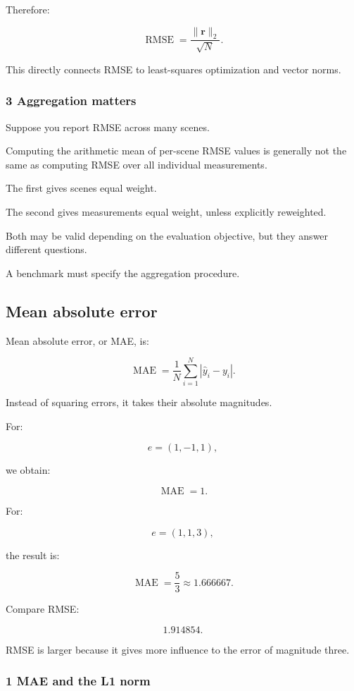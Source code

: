 Therefore:

\[
 \boxed{ \operatorname{RMSE} = \frac{\|\mathbf r\|_2}{\sqrt N} }.
\]

This directly connects RMSE to least-squares optimization and vector norms.

\subsubsection{3 Aggregation matters}\label{02-foundations-ii-ch030-aggregation-matters}

Suppose you report RMSE across many scenes.

Computing the arithmetic mean of per-scene RMSE values is generally not the same as computing RMSE over all individual measurements.

The first gives scenes equal weight.

The second gives measurements equal weight, unless explicitly reweighted.

Both may be valid depending on the evaluation objective, but they answer different questions.

A benchmark must specify the aggregation procedure.

\subsection{Mean absolute error}\label{02-foundations-ii-ch030-mean-absolute-error}

Mean absolute error, or MAE, is:

\[
 \boxed{ \operatorname{MAE} = \frac1N\sum_{i=1}^{N} |\hat y_i-y_i| }.
\]

Instead of squaring errors, it takes their absolute magnitudes.

For:

\[
 e=(1,-1,1),
\]

we obtain:

\[
 \boxed{\operatorname{MAE}=1}.
\]

For:

\[
 e=(1,1,3),
\]

the result is:

\[
 \boxed{ \operatorname{MAE}=\frac53\approx1.666667 }.
\]

Compare RMSE:

\[
 1.914854.
\]

RMSE is larger because it gives more influence to the error of magnitude three.

\subsubsection{1 MAE and the L1 norm}\label{02-foundations-ii-ch030-mae-and-the-l1-norm}

